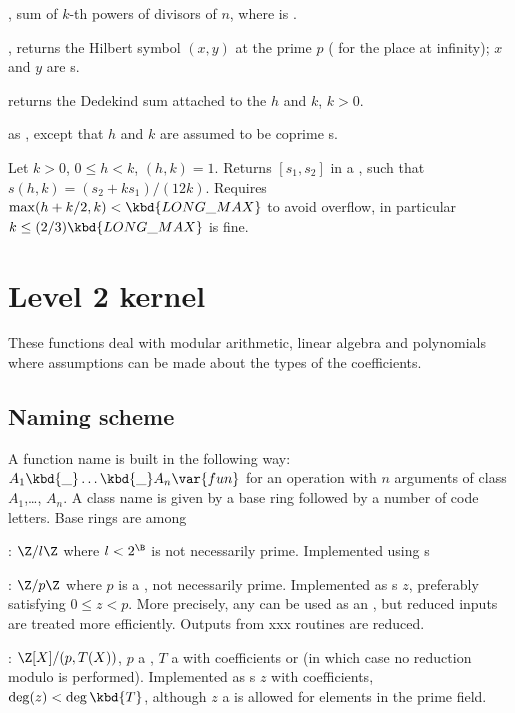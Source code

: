, sum of $k$-th powers of divisors
of  $n$, where  is .

, returns the Hilbert symbol
$(x,y)$ at the prime $p$ ( for the place at infinity); $x$ and $y$
are s.

 returns the Dedekind sum attached to
the  $h$ and $k$, $k > 0$.

 as , except
that $h$ and $k$ are assumed to be coprime s.

Let $k > 0$, $0 \leq h < k$, $(h,k) = 1$. Returns $[s_1,s_2]$
in a , such that $s(h,k) = (s_2 + k s_1) / (12k)$.
Requires $\max(h + k/2, k) < \kbd{LONG\_MAX}$
to avoid overflow, in particular $k \leq (2/3)\kbd{LONG\_MAX}$ is fine.

\newpage
\chapter{Level 2 kernel}

These functions deal with modular arithmetic, linear algebra and polynomials
where assumptions can be made about the types of the coefficients.

\section{Naming scheme}\label{se:level2names}
A function name is built in the following way:
$A_1\kbd{\_}\dots\kbd{\_}A_n\var{fun}$ for an operation  with $n$
arguments of class $A_1$,\dots, $A_n$. A class name is given by a base ring
followed by a number of code letters. Base rings are among

  : $\Z/l\Z$ where $l < 2^{\B}$ is not necessarily prime. Implemented
            using s

  : $\Z/p\Z$ where $p$ is a , not necessarily prime.
Implemented as s $z$, preferably satisfying $0 \leq z < p$.
More precisely, any  can be used as an , but reduced
inputs are treated more efficiently. Outputs from xxx routines are
reduced.

  : $\Z[X]/(p,T(X))$, $p$ a , $T$ a  with 
coefficients or  (in which case no reduction modulo  is
performed). Implemented as s $z$ with  coefficients,
$\deg(z) < \deg \kbd{T}$, although $z$ a  is allowed for elements in
the prime field.

